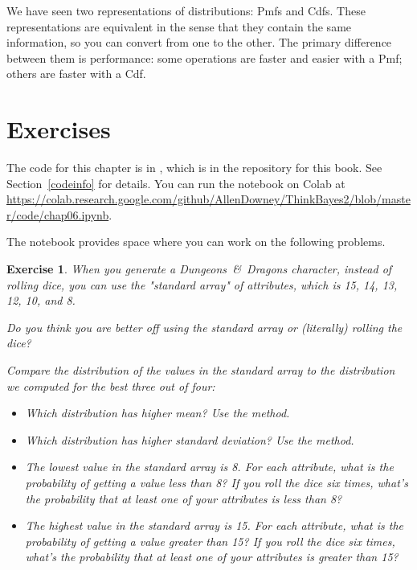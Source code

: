 \documentclass[12pt]{book}
\theoremstyle{exercise}
\newtheorem{exercise}{Exercise}[chapter]
\begin{document}
We have seen two representations of distributions: Pmfs and Cdfs.
These representations are equivalent in the sense that they contain
the same information, so you can convert from one to the other.  The
primary difference between them is performance: some operations are
faster and easier with a Pmf; others are faster with a Cdf.
 



\section{Exercises}

The code for this chapter is in , which is in the repository for this book.  See Section~\ref{codeinfo} for details.
You can run the notebook on Colab at \url{https://colab.research.google.com/github/AllenDowney/ThinkBayes2/blob/master/code/chap06.ipynb}.

The notebook provides space where you can work on the following problems.


\begin{exercise}
When you generate a {\it Dungeons~\&~Dragons} character, instead of rolling dice, you can use the "standard array" of attributes, which is 15, 14, 13, 12, 10, and 8.

Do you think you are better off using the standard array or (literally) rolling the dice?

Compare the distribution of the values in the standard array to the distribution we computed for the best three out of four:

\begin{itemize}

\item Which distribution has higher mean?  Use the  method.

\item Which distribution has higher standard deviation?  Use the  method.

\item The lowest value in the standard array is 8.  For each attribute, what is the probability of getting a value less than 8?  If you roll the dice six times, what's the probability that at least one of your attributes is less than 8?

\item The highest value in the standard array is 15.  For each attribute, what is the probability of getting a value greater than 15?  If you roll the dice six times, what's the probability that at least one of your attributes is greater than 15?

\end{itemize}

\end{exercise}
\end{document}
